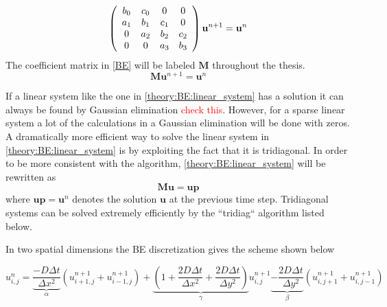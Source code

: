 \begin{align}\label{BE}
 \left(\begin{array}{c c c c}
        b_0 & c_0 &0 &0 \\
        a_1 & b_1 & c_1 &0 \\
        0& a_2 & b_2& c_2\\
        0& 0& a_3 & b_3\\
       \end{array}\right)\mathbf{u}^{n+1} = \mathbf{u}^{n}
\end{align}
\noindent The coefficient matrix in \eqref{BE} will be labeled $\mathbf M$ throughout the thesis.
\begin{equation}\label{theory:BE:linear_system}
  \mathbf{M}\mathbf{u}^{n+1} = \mathbf{u}^{n}
\end{equation}

\noindent If a linear system like the one in \eqref{theory:BE:linear_system} has a solution it can always be found by Gaussian elimination \textcolor{red}{check this}. 
However, for a sparse linear system a lot of the calculations in a Gaussian elimination will be done with zeros. 
A dramatically more efficient way to solve the linear system in \eqref{theory:BE:linear_system} is by exploiting the fact that it is tridiagonal. 
In order to be more consistent with the algorithm, \eqref{theory:BE:linear_system} will be rewritten as
\begin{equation}
  \mathbf{M}\mathbf{u} = \mathbf{up}
\end{equation}
where $\mathbf{up} = \mathbf{u}^{n}$ denotes the solution $\mathbf{u}$ at the previous time step. 
Tridiagonal systems can be solved extremely efficiently by the ``tridiag`` algorithm listed below.



In two spatial dimensions the BE discretization gives the scheme shown below

\begin{equation}\label{general_scheme_BE2D}
 u^{n}_{i,j} = \underbrace{\frac{-D\Delta t}{\Delta x^2}}_{\alpha}\left(u^{n+1}_{i+1,j}+u^{n+1}_{i-1,j}\right) +
 \underbrace{\left(1+\frac{2D\Delta t}{\Delta x^2} +\frac{2D\Delta t}{\Delta y^2}\right)}_{\gamma}u^{n+1}_{i,j} 
 \underbrace{-\frac{2D\Delta t}{\Delta y^2}}_{\beta}\left(u^{n+1}_{i,j+1}+u^{n+1}_{i,j-1}\right)
\end{equation}

